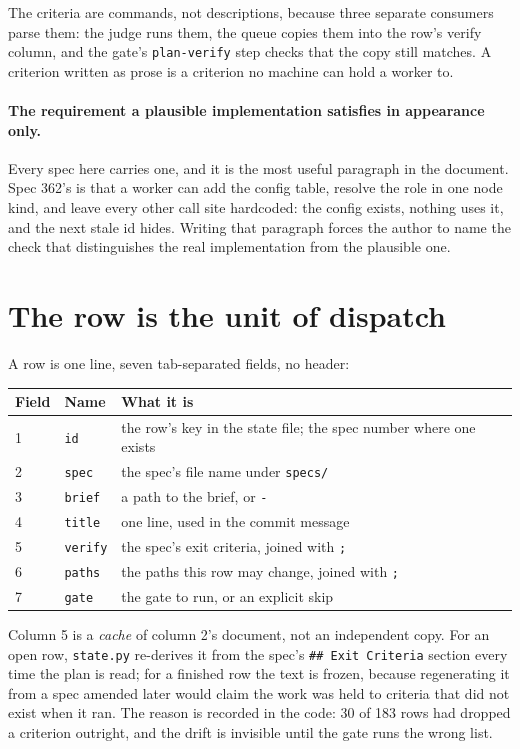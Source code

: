 The criteria are commands, not descriptions, because three separate consumers parse them: the
judge runs them, the queue copies them into the row's verify column, and the gate's
\texttt{plan-verify} step checks that the copy still matches. A criterion written as prose is
a criterion no machine can hold a worker to.

\paragraph{The requirement a plausible implementation satisfies in appearance only.} Every
spec here carries one, and it is the most useful paragraph in the document. Spec 362's is that
a worker can add the config table, resolve the role in one node kind, and leave every other
call site hardcoded: the config exists, nothing uses it, and the next stale id hides. Writing
that paragraph forces the author to name the check that distinguishes the real implementation
from the plausible one.

\section{The row is the unit of dispatch}

A row is one line, seven tab-separated fields, no header:

\begin{longtable}{@{}p{}p{}p{}@{}}
\toprule
\textbf{Field} & \textbf{Name} & \textbf{What it is} \\
\midrule
\endhead
1 & \texttt{id} & the row's key in the state file; the spec number where one exists \\
2 & \texttt{spec} & the spec's file name under \texttt{specs/} \\
3 & \texttt{brief} & a path to the brief, or \texttt{-} \\
4 & \texttt{title} & one line, used in the commit message \\
5 & \texttt{verify} & the spec's exit criteria, joined with \texttt{;} \\
6 & \texttt{paths} & the paths this row may change, joined with \texttt{;} \\
7 & \texttt{gate} & the gate to run, or an explicit skip \\
\bottomrule
\end{longtable}

Column 5 is a \emph{cache} of column 2's document, not an independent copy. For an open row,
\texttt{state.py} re-derives it from the spec's \texttt{\#\# Exit Criteria} section every time
the plan is read; for a finished row the text is frozen, because regenerating it from a spec
amended later would claim the work was held to criteria that did not exist when it ran. The
reason is recorded in the code: 30 of 183 rows had dropped a criterion outright, and the drift
is invisible until the gate runs the wrong list.

